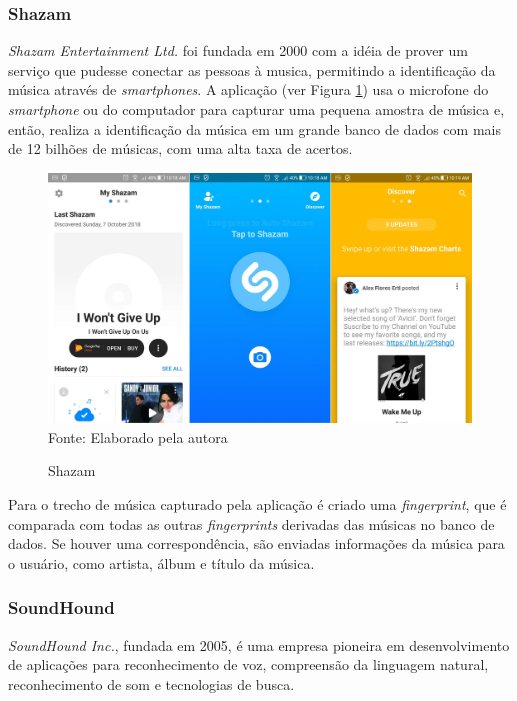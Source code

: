 \subsubsection{Shazam} \label{subsec:shazam}
\textit{Shazam Entertainment Ltd.} foi fundada em 2000 com a idéia de prover um serviço que pudesse conectar as pessoas à musica, permitindo a identificação da música através de \textit{smartphones}. A aplicação (ver Figura \ref{fig:shazam}) usa o microfone do \textit{smartphone} ou do computador para capturar uma pequena amostra de música e, então, realiza a identificação da música em um grande banco de dados com mais de 12 bilhões de músicas, com uma alta taxa de acertos.

\begin{figure}[!htb]
   \centering
   \caption{Shazam}\label{fig:shazam} 
   \includegraphics[scale=0.12]{figuras/shazam.jpg}
   \\Fonte: Elaborado pela autora
\end{figure}

Para o trecho de música capturado pela aplicação é criado uma \textit{fingerprint}, que é comparada com todas as outras \textit{fingerprints} derivadas das músicas no banco de dados. Se houver uma correspondência, são enviadas informações da música para o usuário, como artista, álbum e título da música.

\subsubsection{SoundHound} \label{subsec:soundhound}
\textit{SoundHound Inc.}, fundada em 2005, é uma empresa pioneira em desenvolvimento de aplicações para reconhecimento de voz, compreensão da linguagem natural, reconhecimento de som e tecnologias de busca.

